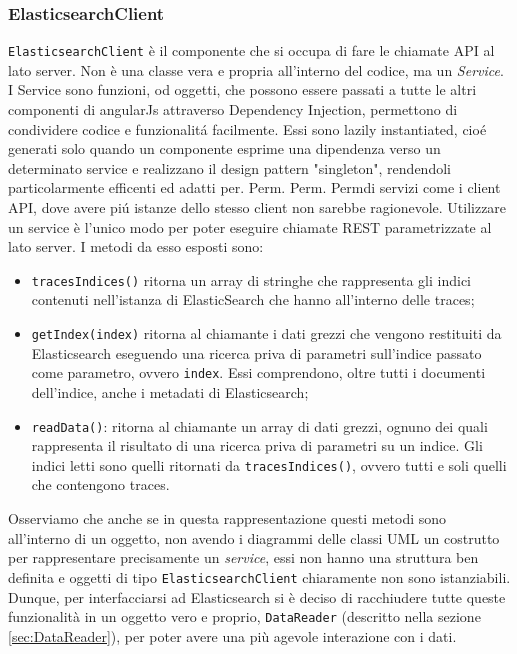 \subsubsection{ElasticsearchClient} 
\texttt{ElasticsearchClient} è il componente che si occupa di fare le chiamate API al lato server. Non è una classe vera e propria all'interno del codice, ma un \emph{Service}. 
I Service sono funzioni, od oggetti, che possono essere passati a tutte le altri componenti di angularJs attraverso Dependency Injection, permettono di condividere codice e funzionalitá facilmente. Essi sono lazily instantiated, cioé generati solo quando un componente esprime una dipendenza verso un determinato service e realizzano il design pattern "singleton", rendendoli particolarmente efficenti ed adatti per. Perm. Perm. Permdi servizi come i client API, dove avere piú istanze dello stesso client non sarebbe ragionevole.
Utilizzare un service è l'unico modo per poter eseguire chiamate REST parametrizzate al lato server. I metodi da esso esposti sono: 
\begin{itemize} 
  \item \texttt{tracesIndices()} ritorna un array di stringhe che rappresenta gli indici contenuti nell'istanza di ElasticSearch che hanno all'interno delle traces; 
  \item \texttt{getIndex(index)} ritorna al chiamante i dati grezzi che vengono restituiti da Elasticsearch eseguendo una ricerca priva di parametri sull'indice passato come parametro, ovvero \texttt{index}. Essi comprendono, oltre tutti i documenti dell'indice, anche i metadati di Elasticsearch; 
  \item \texttt{readData()}: ritorna al chiamante un array di dati grezzi, ognuno dei quali rappresenta il risultato di una ricerca priva di parametri su un indice. Gli indici letti sono quelli ritornati da \texttt{tracesIndices()}, ovvero tutti e soli quelli che contengono traces. 
\end{itemize} 
Osserviamo che anche se in questa rappresentazione questi metodi sono all'interno di un oggetto, non avendo i diagrammi delle classi UML un costrutto per rappresentare precisamente un \emph{service}, essi non hanno una struttura ben definita e oggetti di tipo \texttt{ElasticsearchClient} chiaramente non sono istanziabili. Dunque, per interfacciarsi ad Elasticsearch si è deciso di racchiudere tutte queste funzionalità in un oggetto vero e proprio, \texttt{DataReader} (descritto nella sezione \ref{sec:DataReader}), per poter avere una più agevole interazione con i dati. 
 

